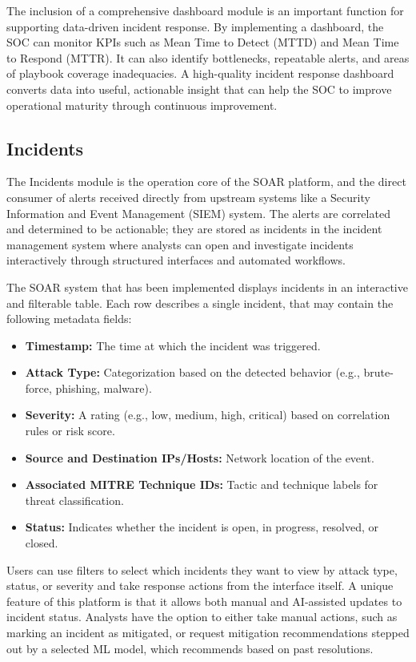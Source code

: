 The inclusion of a comprehensive dashboard module is an important function for supporting data-driven incident response. By implementing a dashboard, the SOC can monitor KPIs such as Mean Time to Detect (MTTD) and Mean Time to Respond (MTTR). It can also identify bottlenecks, repeatable alerts, and areas of playbook coverage inadequacies. A high-quality incident response dashboard converts data into useful, actionable insight that can help the SOC to improve operational maturity through continuous improvement.

\subsection{Incidents}

The Incidents module is the operation core of the SOAR platform, and the direct consumer of alerts received directly from upstream systems like a Security Information and Event Management (SIEM) system. The alerts are correlated and determined to be actionable; they are stored as incidents in the incident management system where analysts can open and investigate incidents interactively through structured interfaces and automated workflows.

The SOAR system that has been implemented displays incidents in an interactive and filterable table. Each row describes a single incident, that may contain the following metadata fields:

\begin{itemize}[noitemsep,topsep=0pt]
    \item \textbf{Timestamp:} The time at which the incident was triggered.
    \item \textbf{Attack Type:} Categorization based on the detected behavior (e.g., brute-force, phishing, malware).
    \item \textbf{Severity:} A rating (e.g., low, medium, high, critical) based on correlation rules or risk score.
    \item \textbf{Source and Destination IPs/Hosts:} Network location of the event.
    \item \textbf{Associated MITRE Technique IDs:} Tactic and technique labels for threat classification.
    \item \textbf{Status:} Indicates whether the incident is open, in progress, resolved, or closed.
\end{itemize}

Users can use filters to select which incidents they want to view by attack type, status, or severity and take response actions from the interface itself. A unique feature of this platform is that it allows both manual and AI-assisted updates to incident status. Analysts have the option to either take manual actions, such as marking an incident as mitigated, or request mitigation recommendations stepped out by a selected ML model, which recommends based on past resolutions. 

